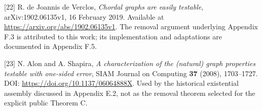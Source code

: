 \documentclass[english,11pt,a4paper]{article}
\begin{document}
{[}22{]} R. de Joannis de Verclos, \emph{Chordal graphs are easily testable}, arXiv:1902.06135v1, 16 February 2019. Available at \url{https://arxiv.org/abs/1902.06135v1}. The removal argument underlying Appendix F.3 is attributed to this work; its implementation and adaptations are documented in Appendix F.5.

{[}23{]} N. Alon and A. Shapira, \emph{A characterization of the (natural) graph properties testable with one-sided error}, SIAM Journal on Computing \textbf{37} (2008), 1703--1727. DOI: \url{https://doi.org/10.1137/06064888X}. Used by the historical existential assembly discussed in Appendix E.2, not as the removal theorem selected for the explicit public Theorem C.

\endgroup
\end{document}

